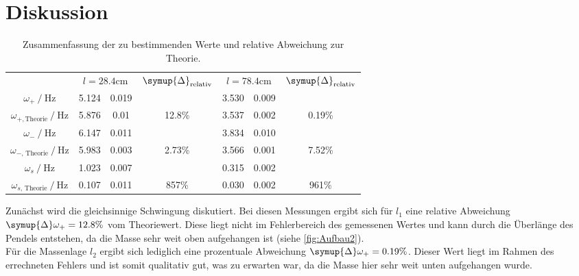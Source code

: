 \section{Diskussion}
\label{sec:Diskussion}
\begin{table}
    \centering
    \caption{Zusammenfassung der zu bestimmenden Werte und relative Abweichung zur Theorie.}
    \begin{tabular}{c S @{${}\pm{}$} S c S[table-format=2.3] @{${}\pm{}$} S[table-format=1.3] c}
    \toprule
    &  &  &  & \\
    \cmidrule(lr){2-3}\cmidrule(lr){4-4}\cmidrule(lr){5-6}\cmidrule(lr){7-7}
    {$\omega_+ \mathbin{/} \unit{\hertz}$}                     & 5.124 & 0.019 &  & 3.530 & 0.009 & \\
    {$\omega_{+,\text{Theorie}} \mathbin{/} \unit{\hertz}$}    & 5.876 & 0.01 & 12.8\% & 3.537 & 0.002 & 0.19\% \\
    {$\omega_- \mathbin{/} \unit{\hertz}$}                     & 6.147 & 0.011 & & 3.834 & 0.010 & \\
    {$\omega_{{-}\text{, Theorie}} \mathbin{/} \unit{\hertz}$} & 5.983 & 0.003 & 2.73\% & 3.566 & 0.001 & 7.52\% \\
    {$\omega_s \mathbin{/} \unit{\hertz}$}                     & 1.023 & 0.007 & & 0.315 & 0.002 & \\
    {$\omega_{{s}\text{, Theorie}} \mathbin{/} \unit{\hertz}$} & 0.107 & 0.011 & 857\% & 0.030 & 0.002 & 961\% \\
    \bottomrule
    \end{tabular}
\end{table}


Zunächst wird die gleichsinnige Schwingung diskutiert. Bei diesen Messungen ergibt sich für $l_1$ eine relative Abweichung 
$\symup{\Delta}\omega_{+} = 12.8\%$ vom Theoriewert. Diese liegt nicht im Fehlerbereich des gemessenen Wertes und kann durch die Überlänge des Pendels entstehen, da die Masse sehr
weit oben aufgehangen ist (siehe \autoref{fig:Aufbau2}).\\ Für die Massenlage $l_2$ ergibt sich lediglich eine prozentuale Abweichung $\symup{\Delta}\omega_{+} = 0.19\%$. Dieser Wert
liegt im Rahmen des errechneten Fehlers und ist somit qualitativ gut, was zu erwarten war, da die Masse hier sehr weit unten aufgehangen wurde.



